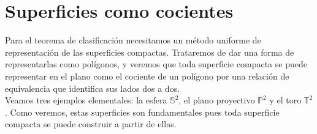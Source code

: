 \documentclass[10pt]{report}
\newcommand{\Esfera}{\mathbb{S}^2}
\newcommand{\Toro}{\mathbb{T}^2}
\newcommand{\Proyectivo}{\mathbb{P}^2}
\theoremstyle{definition}
\begin{document}
\section{Superficies como cocientes}

Para el teorema de clasificación necesitamos un método uniforme de representación de las superficies compactas. Trataremos de dar una forma de representarlas como polígonos, y veremos que toda superficie compacta se puede representar en el plano como el cociente de un polígono por una relación de equivalencia que identifica sus lados dos a dos.\\
Veamos tres ejemplos elementales: la esfera $\Esfera$, el plano proyectivo $\Proyectivo$ y el toro $\Toro$. Como veremos, estas superficies son fundamentales pues toda superficie compacta se puede construir a partir de ellas. 
\end{document}
